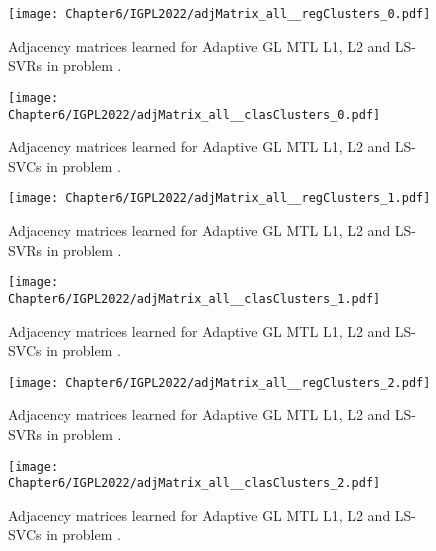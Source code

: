     



\begin{figure}[t!]
    \centering
    \texttt{[image: Chapter6/IGPL2022/adjMatrix\_all\_\_regClusters\_0.pdf]}
    \caption{Adjacency matrices learned for Adaptive GL MTL L1, L2 and LS-SVRs in problem .}
    \label{fig:reg_adjmatrix_regClusters0}
\end{figure}

\begin{figure}[t!]
    \centering
    \texttt{[image: Chapter6/IGPL2022/adjMatrix\_all\_\_clasClusters\_0.pdf]}
    \caption{Adjacency matrices learned for Adaptive GL MTL L1, L2 and LS-SVCs in problem .}
    \label{fig:clas_adjmatrix_clasClusters0}
\end{figure}


\begin{figure}[t!]
    \centering
    \texttt{[image: Chapter6/IGPL2022/adjMatrix\_all\_\_regClusters\_1.pdf]}
    \caption{Adjacency matrices learned for Adaptive GL MTL L1, L2 and LS-SVRs in problem .}
    \label{fig:reg_adjmatrix_regClusters1}
\end{figure}

\begin{figure}[t!]
    \centering
    \texttt{[image: Chapter6/IGPL2022/adjMatrix\_all\_\_clasClusters\_1.pdf]}
    \caption{Adjacency matrices learned for Adaptive GL MTL L1, L2 and LS-SVCs in problem .}
    \label{fig:clas_adjmatrix_clasClusters1}
\end{figure}


\begin{figure}[t!]
    \centering
    \texttt{[image: Chapter6/IGPL2022/adjMatrix\_all\_\_regClusters\_2.pdf]}
    \caption{Adjacency matrices learned for Adaptive GL MTL L1, L2 and LS-SVRs in problem .}
    \label{fig:reg_adjmatrix_regClusters2}
\end{figure}

\begin{figure}[t!]
    \centering
    \texttt{[image: Chapter6/IGPL2022/adjMatrix\_all\_\_clasClusters\_2.pdf]}
    \caption{Adjacency matrices learned for Adaptive GL MTL L1, L2 and LS-SVCs in problem .}
    \label{fig:clas_adjmatrix_clasClusters2}
\end{figure}


